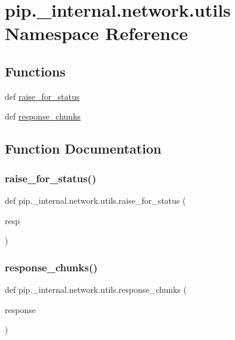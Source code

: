 \hypertarget{namespacepip_1_1__internal_1_1network_1_1utils}{}\section{pip.\+\_\+internal.\+network.\+utils Namespace Reference}
\label{namespacepip_1_1__internal_1_1network_1_1utils}
\subsection*{Functions}
\begin{DoxyCompactItemize}
\item 
def \hyperlink{namespacepip_1_1__internal_1_1network_1_1utils_abe3accd2df0d9810f04a803d32a5ba42}{raise\+\_\+for\+\_\+status}
\item 
def \hyperlink{namespacepip_1_1__internal_1_1network_1_1utils_a65d17561a81f78f761bf6304424f8001}{response\+\_\+chunks}
\end{DoxyCompactItemize}


\subsection{Function Documentation}
\mbox{\label{namespacepip_1_1__internal_1_1network_1_1utils_abe3accd2df0d9810f04a803d32a5ba42}} 
\subsubsection{\texorpdfstring{raise\+\_\+for\+\_\+status()}{raise\_for\_status()}}
{\footnotesize\ttfamily def pip.\+\_\+internal.\+network.\+utils.\+raise\+\_\+for\+\_\+status (\begin{DoxyParamCaption}\item[{}]{resp }\end{DoxyParamCaption})}

\mbox{\label{namespacepip_1_1__internal_1_1network_1_1utils_a65d17561a81f78f761bf6304424f8001}} 
\subsubsection{\texorpdfstring{response\+\_\+chunks()}{response\_chunks()}}
{\footnotesize\ttfamily def pip.\+\_\+internal.\+network.\+utils.\+response\+\_\+chunks (\begin{DoxyParamCaption}\item[{}]{response }\end{DoxyParamCaption})}

